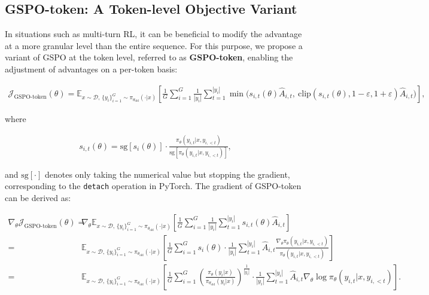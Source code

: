 \subsection{GSPO-token: A Token-level Objective Variant}

In situations such as multi-turn RL, it can be beneficial to modify the advantage at a more granular level than the entire sequence. For this purpose, we propose a variant of GSPO at the token level, referred to as \textbf{GSPO-token}, enabling the adjustment of advantages on a per-token basis:

\begin{align}
\mathcal{J}_\text{GSPO-token}(\theta)
=
\mathbb{E}_{ x \sim \mathcal{D},\, \{y_i\}_{i=1}^G \sim \pi_{\theta_\text{old}}( \cdot | x) }
\left[ 
\frac{1}{G} \sum_{i=1}^{G} \frac{1}{|y_i|} \sum_{t=1}^{|y_i|} 
\min \Bigg( s_{i,t}(\theta) \widehat{A}_{i,t},\  
\mathrm{clip} \left( s_{i,t}(\theta), 1 - \varepsilon, 1 + \varepsilon \right) \widehat{A}_{i,t} \Bigg) 
\right],
\label{equ:gspo-token}
\end{align}

where

\begin{align}
s_{i,t}(\theta) 
= \mathrm{sg} \left[ s_{i}(\theta) \right]  \cdot \frac{ \pi_{\theta} (y_{i,t} | x, y_{i,<t}) }{ \mathrm{sg} \left[ \pi_{\theta} (y_{i,t} | x, y_{i,<t}) \right] },
\end{align}

and $\mathrm{sg}[\cdot]$ denotes only taking the numerical value but stopping the gradient, corresponding to the \texttt{detach} operation in PyTorch. The gradient of GSPO-token can be derived as:

\begin{align}
\nabla_{\theta} \mathcal{J}_\text{GSPO-token}(\theta)
=&\ 
\nabla_{\theta} \mathbb{E}_{ x \sim \mathcal{D},\, \{y_i\}_{i=1}^G \sim \pi_{\theta_\text{old}}( \cdot | x) }
\left[ 
\frac{1}{G} \sum_{i=1}^{G}
\frac{1}{|y_i|} \sum_{t=1}^{|y_i|} 
s_{i,t}(\theta) \widehat{A}_{i,t}
\right] \\
=&\ 
\mathbb{E}_{ x \sim \mathcal{D},\, \{y_i\}_{i=1}^G \sim \pi_{\theta_\text{old}}( \cdot | x) }
\left[ 
\frac{1}{G} \sum_{i=1}^{G} s_i (\theta) \cdot \frac{1}{|y_i|} \sum_{t=1}^{|y_i|} 
\widehat{A}_{i,t} \frac{ \nabla_{\theta} \pi_{\theta} (y_{i,t} | x, y_{i,<t}) }{ \pi_{\theta} (y_{i,t} | x, y_{i,<t}) }
\right] \\
=&\ 
\mathbb{E}_{ x \sim \mathcal{D},\, \{y_i\}_{i=1}^G \sim \pi_{\theta_\text{old}}( \cdot | x) }
\left[
\frac{1}{G} \sum_{i=1}^{G} \left( \frac{ \pi_{\theta} (y_i | x) }{ \pi_{\theta_\text{old}} (y_i | x)} \right)^{\frac{1}{|y_i|}}
\cdot \frac{1}{|y_i|} \sum_{t=1}^{|y_i|}
\widehat{A}_{i,t} \nabla_{\theta} \log \pi_{\theta} (y_{i,t} | x, y_{i,<t})
\right].
\label{equ:gspo-token_grad}
\end{align}

